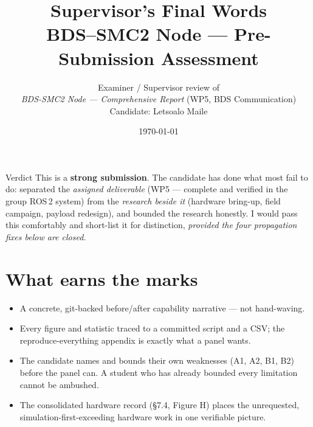 \documentclass[11pt,a4paper]{article}
\title{\vspace{-1.5em}\textbf{Supervisor's Final Words}\\[0.3em]
  \large BDS--SMC2 Node --- Pre-Submission Assessment}
\author{Examiner / Supervisor review of\\
  \emph{BDS-SMC2 Node --- Comprehensive Report} (WP5, BDS Communication)\\
  Candidate: Letsoalo Maile}
\date{\today}
\begin{document}
\maketitle
\thispagestyle{empty}

\begin{verdictbox}{Verdict}
This is a \textbf{strong submission}. The candidate has done what most fail to do:
separated the \emph{assigned deliverable} (WP5 --- complete and verified in the group
ROS\,2 system) from the \emph{research beside it} (hardware bring-up, field campaign,
payload redesign), and bounded the research honestly. I would pass this comfortably and
short-list it for distinction, \emph{provided the four propagation fixes below are closed.}
\end{verdictbox}

\section*{What earns the marks}
\begin{itemize}[leftmargin=1.4em,itemsep=2pt]
  \item A concrete, git-backed before/after capability narrative --- not hand-waving.
  \item Every figure and statistic traced to a committed script and a CSV; the
        reproduce-everything appendix is exactly what a panel wants.
  \item The candidate names and bounds their own weaknesses (A1, A2, B1, B2)
        before the panel can. A student who has already bounded every limitation
        cannot be ambushed.
  \item The consolidated hardware record (\S7.4, Figure H) places the unrequested,
        simulation-first-exceeding hardware work in one verifiable picture.
\end{itemize}

\end{document}
